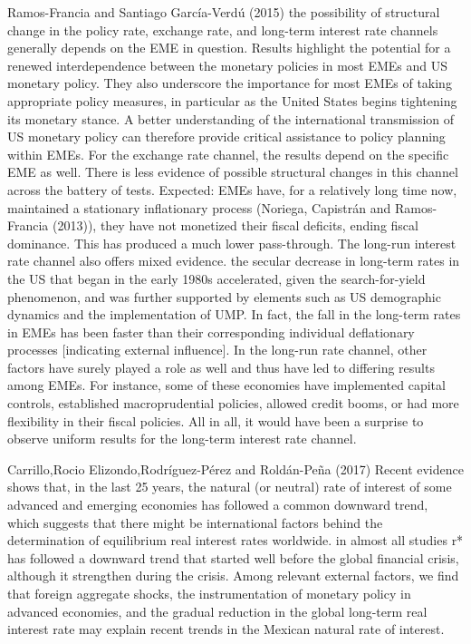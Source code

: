 Ramos-Francia and Santiago García-Verdú (2015)
the possibility of structural change in the policy rate, exchange rate, and long-term interest rate channels generally depends on the EME in question.
Results highlight the potential for a renewed interdependence between the monetary policies in most EMEs and US monetary policy. They also underscore the importance for most EMEs of taking appropriate policy measures, in particular as the United States begins tightening its monetary stance.
A better understanding of the international transmission of US monetary policy can therefore provide critical assistance to policy planning within EMEs.
For the exchange rate channel, the results depend on the specific EME as well. There is less evidence of possible structural changes in this channel across the battery of tests. Expected: EMEs have, for a relatively long time now, maintained a stationary inflationary
process (Noriega, Capistrán and Ramos-Francia (2013)), they have not monetized their fiscal deficits, ending fiscal dominance. This has produced a much lower pass-through.
The long-run interest rate channel also offers mixed evidence. the secular decrease in
long-term rates in the US that began in the early 1980s accelerated, given
the search-for-yield phenomenon, and was further supported by elements such as
US demographic dynamics and the implementation of UMP. In fact, the fall in the long-term rates in EMEs has been faster than their corresponding individual deflationary processes [indicating external influence].
In the long-run rate channel, other factors have surely played a role as well and thus have led to differing results among EMEs. For instance, some of these economies have implemented capital controls, established macroprudential policies, allowed credit booms, or had more flexibility in their fiscal policies. All in all, it would have been a surprise to observe uniform results for the long-term interest rate channel.

Carrillo,Rocio Elizondo,Rodríguez-Pérez and Roldán-Peña (2017)
Recent evidence shows that, in the last 25 years, the natural (or neutral) rate of interest of some advanced and emerging economies has followed a common downward trend, which suggests that there might be international factors behind the determination of equilibrium real interest rates worldwide. 
in almost all studies r* has followed a downward trend that started well before the global financial crisis, although it strengthen during the crisis.
Among relevant external factors, we find that foreign aggregate shocks, the instrumentation of monetary policy in advanced economies, and the gradual reduction in the global long-term real interest rate may explain recent trends in the Mexican natural rate of interest. 

